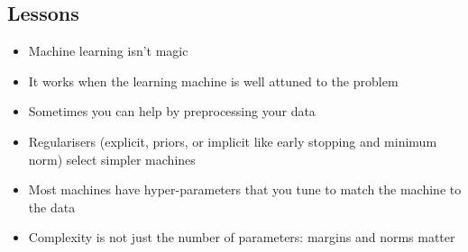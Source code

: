 
\begin{slide}
\section{Lessons}

\begin{PauseHighLight}
  \begin{itemize}
  \item Machine learning isn't magic\pause
  \item It works when the learning machine is well attuned to the
    problem\pause
  \item Sometimes you can help by preprocessing your data\pause
  \item Regularisers (explicit, priors, or implicit like early
    stopping and minimum norm) select simpler machines\pause
  \item Most machines have hyper-parameters that you tune to match the
    machine to the data\pause
  \item Complexity is not just the number of parameters: margins and
    norms matter\pause
  \end{itemize}
\end{PauseHighLight}

\end{slide}





